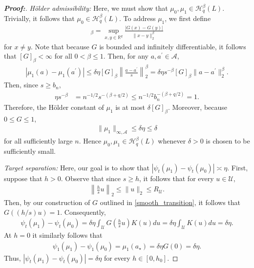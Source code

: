 \documentclass[11pt,twoside]{article}
\theoremstyle{definition}
\theoremstyle{remark}
\begin{document}
\begin{proof}[\textbf{Proof:}]
\textit{H\"older admissibility:} Here, we must show that $\mu_0, \mu_1 \in  \mathcal{H}_q^\beta(L)$. Trivially, it follows that $\mu_0 \in \mathcal{H}_q^\beta(L)$. To address $\mu_1$, we first define
\begin{align*}
      [G]_{\beta} = \sup_{x,y\in\mathbb{R}^q} \frac{|G(x)-G(y)|}{\|x-y\|_2^\beta}
\end{align*}
for $x \neq y$. Note that because $G$ is bounded and infinitely differentiable, it follows that $[G]_{\beta} < \infty$ for all $0 < \beta \leq 1$. Then, for any $a, a^\prime \in \mathcal{A}$,
\begin{align*}
    |\mu_1(a)-\mu_1(a^\prime)| \leq \delta\eta [G]_\beta \left\| \frac{a-a^\prime}{s} \right\|_2^\beta = \delta\eta s^{-\beta}[G]_\beta \|a-a^\prime\|_2^\beta.
\end{align*}
Then, since $s\geq b_n$,
\begin{align*}
    \eta s^{-\beta} &= n^{-1/2}s^{-(\beta+q/2)} \leq n^{-1/2}b_n^{-(\beta+q/2)} = 1.
\end{align*}
Therefore, the H\"older constant of $\mu_1$ is at most
$\delta[G]_\beta$. Moreover, because $0\leq G\leq1$,
\begin{align*}
      \|\mu_1\|_{\infty,\mathcal{A}} \leq \delta\eta \leq \delta
\end{align*}
for all sufficiently large $n$. Hence $\mu_0,\mu_1\in\mathcal{H}_q^\beta(L)$ whenever $\delta>0$ is chosen to be sufficiently small. \medskip

\textit{Target separation:} Here, our goal is to show that $|\psi_t(\mu_1) - \psi_t(\mu_0)| \asymp \eta$. First, suppose that $h > 0$. Observe that since $s \geq h$, it follows that for every $u \in \mathcal{U}$,
\begin{align*}
      \left\|\frac{h}{s}u\right\|_2 \leq \|u\|_2 \leq R_{\mathcal{U}}.
\end{align*}
Then, by our construction of $G$ outlined in \cref{smooth_transition}, it follows that $G((h/s)u)=1$. Consequently,
\begin{align*}
     \psi_t(\mu_1)-\psi_t(\mu_0) = \delta\eta \int_{\mathcal{U}} G\!\left(\frac{h}{s}u\right)K(u)du = \delta\eta \int_{\mathcal{U}}K(u) du = \delta\eta.
\end{align*}
At $h = 0$ it similarly follows that
\begin{align*}
     \psi_1(\mu_1)-\psi_1(\mu_0) = \mu_1(a_\star) = \delta\eta G(0) = \delta\eta.
\end{align*}
Thus, $|\psi_t(\mu_1)-\psi_t(\mu_0)| = \delta\eta$ for every $h\in[0,h_0]$. \medskip


\end{proof}
\end{document}
